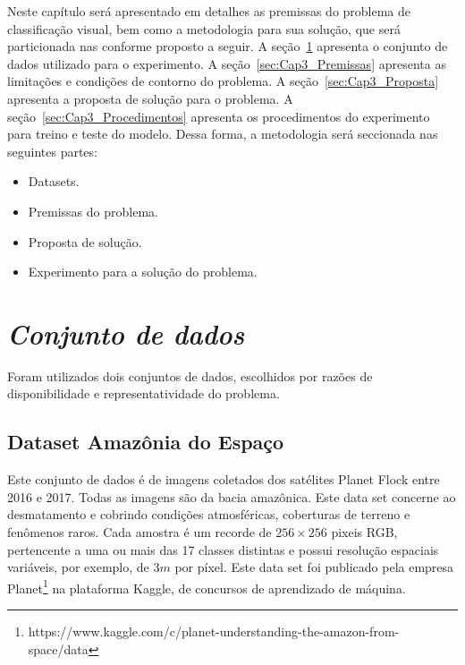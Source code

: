 
Neste capítulo será apresentado em detalhes as premissas do problema de classificação visual, bem como a metodologia para sua solução, que será particionada nas conforme proposto a seguir. A seção~\ref{sec:Cap3_Dataset} apresenta o conjunto de dados utilizado para o experimento.  A seção~\ref{sec:Cap3_Premissas} apresenta as limitações e condições de contorno do problema. A seção~\ref{sec:Cap3_Proposta} apresenta a proposta de solução para o problema. A seção~\ref{sec:Cap3_Procedimentos} apresenta os procedimentos do experimento para treino e teste do modelo. Dessa forma, a metodologia será seccionada nas seguintes partes:

\begin{itemize}
    \item  Datasets.
    \item  Premissas do problema.
    \item  Proposta de solução.
    \item  Experimento para a solução do problema.

\end{itemize}


\section{\textit{Conjunto de dados}}\label{sec:Cap3_Dataset}
Foram utilizados dois conjuntos de dados, escolhidos por razões de disponibilidade e representatividade do problema. 


\subsection{Dataset Amazônia do Espaço}\label{sec:Cap3_Amazon_dataset}

Este conjunto de dados é de imagens coletados dos satélites Planet Flock entre 2016 e 2017. Todas as imagens são da bacia amazônica. Este data set concerne ao desmatamento e cobrindo condições atmosféricas, coberturas de terreno e fenômenos raros. Cada amostra é um recorde de $256 \times 256$ pixeis RGB, pertencente a uma ou mais das 17 classes distintas e possui resolução espaciais variáveis, por exemplo, de $3 m$ por píxel. Este data set foi publicado pela empresa Planet\footnote{https://www.kaggle.com/c/planet-understanding-the-amazon-from-space/data} na plataforma Kaggle, de concursos de aprendizado de máquina.

